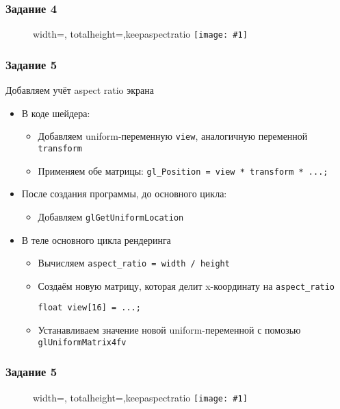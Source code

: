 \documentclass{beamer}
\newcommand{\slideimage}[1]{
  \begin{figure}
    \begin{adjustbox}{width=\textwidth, totalheight=\textheight-2\baselineskip-2\baselineskip,keepaspectratio}
      \texttt{[image: \#1]}
    \end{adjustbox}
  \end{figure}
}
\begin{document}
\begin{frame}
\frametitle{Задание 4}
\slideimage{4.png}
\end{frame}

\begin{frame}[fragile]
\frametitle{Задание 5}
Добавляем учёт aspect ratio экрана
\begin{itemize}
\pause
\item В коде шейдера:
\begin{itemize}
\item Добавляем uniform-переменную \verb|view|, аналогичную переменной \verb|transform|
\pause 
\item Применяем обе матрицы: \verb|gl_Position = view * transform * ...;|
\end{itemize}
\pause
\item После создания программы, до основного цикла:
\begin{itemize}
\item Добавляем \verb|glGetUniformLocation|
\end{itemize}
\pause
\item В теле основного цикла рендеринга
\begin{itemize}
\item Вычисляем \verb|aspect_ratio = width / height|
\pause
\item Создаём новую матрицу, которая делит x-координату на \verb|aspect_ratio|
\begin{verbatim}
float view[16] = ...;
\end{verbatim}
\pause
\item Устанавливаем значение новой uniform-переменной с помозью \verb|glUniformMatrix4fv|
\end{itemize}
\end{itemize}
\end{frame}

\begin{frame}
\frametitle{Задание 5}
\slideimage{5.png}
\end{frame}
\end{document}
